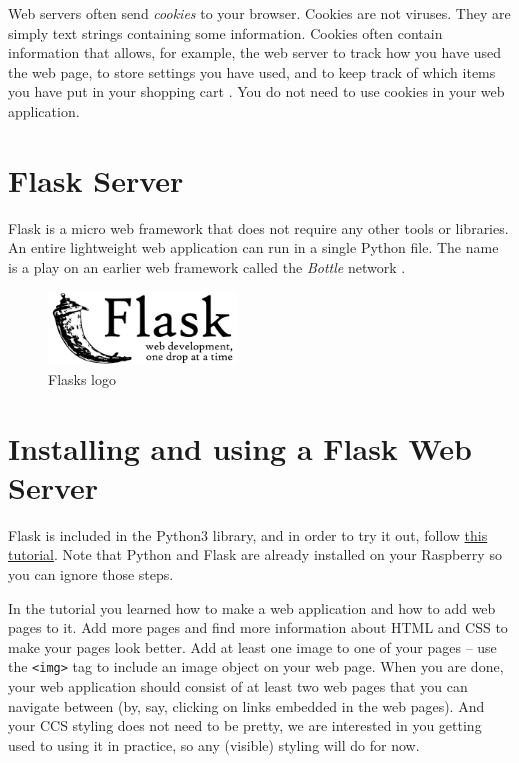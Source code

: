 \documentclass{article}
\begin{document}
Web servers often send \textit{cookies} to your browser. Cookies are not viruses. They are simply text strings containing some information. Cookies often contain information that allows, for example, the web server to track how you have used the web page, to store settings you have used, and to keep track of which items you have put in your shopping cart \cite{cookie}. You do not need to use cookies in your web application.

\section{Flask Server}
Flask is a micro web framework that does not require any other tools or libraries. An entire lightweight web application can run in a single Python file. The name is a play on an earlier web framework called the \emph{Bottle} network \cite{bottle}.
\begin{figure}[h]
    \centering
    \includegraphics[width=50mm]{1920px-Flask_logo.svg.png}
    \caption{Flasks logo}
    \label{fig:flask}
\end{figure}

\section{Installing and using a Flask Web Server}
Flask is included in the Python3 library, and in order to try it out, follow {\color{blue} \href{https://projects.raspberrypi.org/en/projects/python-web-server-with-flask/0}{this tutorial}}. Note that Python and Flask are already installed on your Raspberry so you can ignore those steps.

In the tutorial you learned how to make a web application and how to add web pages to it. Add more pages and find more information about HTML and CSS to make your pages look better. Add at least one image to one of your pages -- use the \verb!<img>! tag to include an image object on your web page.
When you are done, your web application should consist of at least two web pages that you can navigate between (by, say, clicking on links embedded in the web pages). And your CCS styling does not need to be pretty, we are interested in you getting used to using it in practice, so any (visible) styling will do for now.\\
\end{document}
